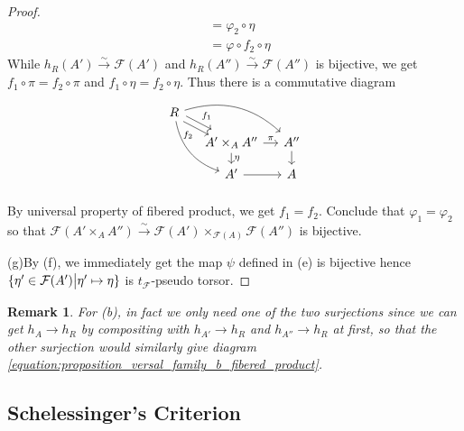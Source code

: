 \documentclass{ctexart}
\newtheorem{remark}{Remark}[section]
\begin{document}
\begin{proof}
\begin{equation}
\begin{split}
            & = \varphi_{2} \circ \eta \\
            & = \varphi \circ f_{2} \circ \eta
        \end{split}
    \end{equation}
    While $h_{R}(A') \overset{\sim}{\rightarrow} \mathcal{F}(A')$ and $h_{R}(A'') \overset{\sim}{\rightarrow} \mathcal{F}(A'')$ is bijective, 
    we get $f_{1} \circ \pi = f_{2} \circ \pi$ and $f_{1} \circ \eta = f_{2} \circ \eta$.
    Thus there is a commutative diagram
    \begin{equation}
        \begin{tikzcd}[sep = small]
            R \arrow[drr, bend left] \arrow[dr, "f_{1}", shift left] \arrow[dr, "f_{2}" swap, shift right] \arrow[ddr, bend right]&& \\
            & A' \times_{A} A'' \arrow[r, "\pi"] \arrow[d, "\eta"] & 
            A'' \arrow[d] \\
            & A' \arrow[r] &
            A \\
        \end{tikzcd}
    \end{equation}
    By universal property of fibered product, we get $f_{1} = f_{2}$.
    Conclude that $\varphi_{1} = \varphi_{2}$ so that $\mathcal{F}(A' \times_{A} A'') \overset{\sim}{\rightarrow} \mathcal{F}(A') \times_{\mathcal{F}(A)} \mathcal{F}(A'')$ is bijective.
    \par
    (g)By (f), we immediately get the map $\psi$ defined in (e) is bijective hence $\{\eta'\in \mathcal{F}(A') \big{|} \eta' \mapsto \eta\}$ is $t_{\mathcal{F}}$-pseudo torsor.
\end{proof}
\begin{remark}
    For (b), in fact we only need one of the two surjections since we can get $h_{A} \rightarrow h_{R}$ by compositing with $h_{A'} \rightarrow h_{R}$ and $h_{A''} \rightarrow h_{R}$ at first,
    so that the other surjection would similarly give diagram \ref{equation:proposition_versal_family_b_fibered_product}.
\end{remark}

\subsection{Schelessinger's Criterion}
\label{subsection:Formal_Family_Schelessinger's_Criterion}
\end{document}

